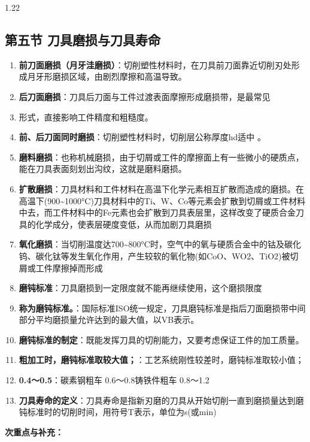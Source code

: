 \documentclass[12pt,a4paper]{article}
\begin{document}
\begin{spacing}{1.22}
\subsection{第五节 刀具磨损与刀具寿命}
\begin{tcolorbox}[colback=yellow!6,colframe=red!55!black,title=重点,left=1mm,right=1mm]
\begin{enumerate}[leftmargin=2.2em,label=\arabic*.]
  \item \textbf{前刀面磨损（月牙洼磨损）}：切削塑性材料时，在刀具前刀面靠近切削刃处形成月牙形磨损区域，由剧烈摩擦和高温导致。
  \item \textbf{后刀面磨损}：刀具后刀面与工件过渡表面摩擦形成磨损带，是最常见
  \item 形式，直接影响工件精度和粗糙度。
  \item \textbf{前、后刀面同时磨损}：切削塑性材料时，切削层公称厚度hd适中 。
  \item \textbf{磨料磨损}：也称机械磨损，由于切屑或工件的摩擦面上有一些微小的硬质点，能在刀具表面刻划出沟纹，这就是磨料磨损。
  \item \textbf{扩散磨损}：刀具材料和工件材料在高温下化学元素相互扩散而造成的磨损。在高温下(900\textasciitilde{}1000°C)刀具材料中的Ti、W、Co等元素会扩散到切屑或工件材料中去，而工件材料中的Fe元素也会扩散到刀具表层里，这样改变了硬质合金刀具的化学成分，使表层硬度变低，从而加剧刀具磨损
  \item \textbf{氧化磨损}：当切削温度达700\textasciitilde{}800°C时，空气中的氧与硬质合金中的钴及碳化钨、碳化钛等发生氧化作用，产生较软的氧化物(如CoO、WO2、TiO2)被切屑或工件摩擦掉而形成
  \item \textbf{磨钝标准}：刀具磨损到一定限度就不能再继续使用，这个磨损限度
  \item \textbf{称为磨钝标准。}：国际标准ISO统一规定，刀具磨钝标准是指后刀面磨损带中间部分平均磨损量允许达到的最大值，以VB表示。
  \item \textbf{磨钝标准的制定}：既能发挥刀具的切削能力，又要考虑保证工件的加工质量。
  \item \textbf{粗加工时，磨钝标准取较大值；}：工艺系统刚性较差时，磨钝标准取较小值；
  \item \textbf{0.4～0.5}：碳素钢粗车 0.6～0.8铸铁件粗车 0.8～1.2
  \item \textbf{刀具寿命的定义}：刀具寿命是指新刃磨的刀具从开始切削一直到磨损量达到磨钝标准时的切削时间，用符号T表示，单位为s(或min)
\end{enumerate}
\end{tcolorbox}
\noindent\textbf{次重点与补充：}
\begin{itemize}[leftmargin=2.2em,label=--]

\end{itemize}
\end{spacing}
\end{document}

